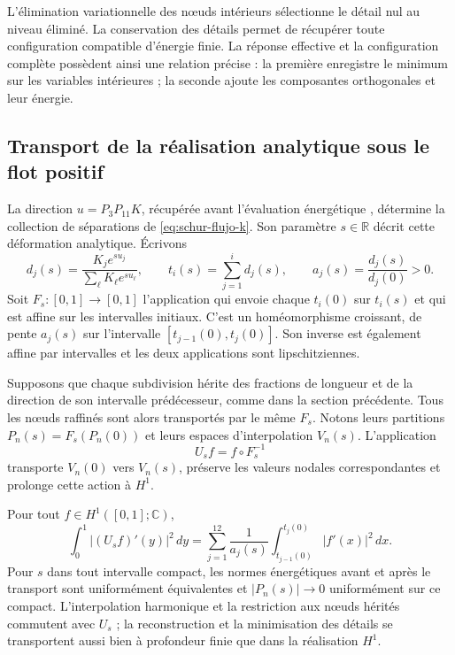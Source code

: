 L'élimination variationnelle des nœuds intérieurs sélectionne le détail nul au niveau éliminé. La conservation des détails permet de récupérer toute configuration compatible d'énergie finie. La réponse effective et la configuration complète possèdent ainsi une relation précise : la première enregistre le minimum sur les variables intérieures ; la seconde ajoute les composantes orthogonales et leur énergie.

\subsection{Transport de la réalisation analytique sous le flot positif}

La direction \(u=P_3P_{11}K\), récupérée avant l'évaluation énergétique \cite{hmtX}, détermine la collection de séparations de \eqref{eq:schur-flujo-k}. Son paramètre \(s\in\mathbb R\) décrit cette déformation analytique. Écrivons
\[
 d_j(s)=\frac{K_je^{su_j}}{\sum_\ell K_\ell e^{su_\ell}},
 \qquad
 t_i(s)=\sum_{j=1}^id_j(s),
 \qquad
 a_j(s)=\frac{d_j(s)}{d_j(0)}>0.
\]
Soit \(F_s:[0,1]\to[0,1]\) l’application qui envoie chaque
\(t_i(0)\) sur \(t_i(s)\) et qui est affine sur les intervalles initiaux.
C’est un homéomorphisme croissant, de pente \(a_j(s)\) sur
l’intervalle \([t_{j-1}(0),t_j(0)]\). Son inverse est également affine
par intervalles et les deux applications sont lipschitziennes.

Supposons que chaque subdivision hérite des fractions de longueur et de la direction de son intervalle prédécesseur, comme dans la section précédente. Tous les nœuds raffinés sont alors transportés par le même \(F_s\). Notons leurs partitions \(P_n(s)=F_s(P_n(0))\) et leurs espaces d'interpolation \(V_n(s)\). L'application
\[
 U_s f=f\circ F_s^{-1}
\]
transporte \(V_n(0)\) vers \(V_n(s)\), préserve les valeurs nodales correspondantes et prolonge cette action à \(H^1\).

\begin{theorem}
\label{thm:transporte-h1-flujo-k}
Pour tout \(f\in H^1([0,1];\mathbb C)\),
\begin{equation}
 \int_0^1|(U_sf)'(y)|^2\,dy
 =\sum_{j=1}^{12}\frac1{a_j(s)}
 \int_{t_{j-1}(0)}^{t_j(0)}|f'(x)|^2\,dx.
 \label{eq:transporte-energia-h1-k}
\end{equation}
Pour \(s\) dans tout intervalle compact, les normes énergétiques avant et après le transport sont uniformément équivalentes et \(|P_n(s)|\to0\) uniformément sur ce compact. L'interpolation harmonique et la restriction aux nœuds hérités commutent avec \(U_s\) ; la reconstruction et la minimisation des détails se transportent aussi bien à profondeur finie que dans la réalisation \(H^1\).
\end{theorem}

